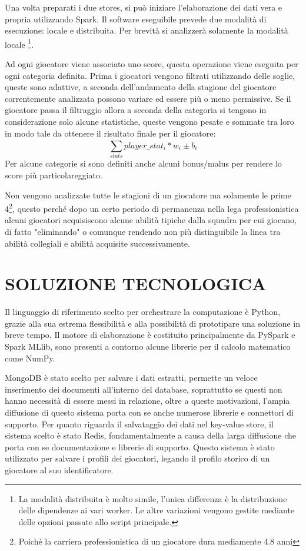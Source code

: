 \documentclass[10pt,a4paper,twocolumn]{article}
\begin{document}
Una volta preparati i due stores, si può iniziare l'elaborazione dei dati vera e propria utilizzando Spark. Il software eseguibile prevede due modalità di esecuzione: locale e distribuita. Per brevità si analizzerà solamente la modalità locale \footnote{La modalità distribuita è molto simile, l'unica differenza è la distribuzione delle dipendenze ai vari worker. Le altre variazioni vengono gestite mediante delle opzioni passate allo script principale.}.

Ad ogni giocatore viene associato uno score, questa operazione viene eseguita per ogni categoria definita. Prima i giocatori vengono filtrati utilizzando delle soglie, queste sono adattive, a seconda dell'andamento della stagione del giocatore correntemente analizzata possono variare ed essere più o meno permissive. Se il giocatore passa il filtraggio allora a seconda della categoria si tengono in considerazione solo alcune statistiche, queste vengono pesate e sommate tra loro in modo tale da ottenere il risultato finale per il giocatore: \[\sum_{stats}^{} player\_stat_{i} * w_{i} \pm b_{i}\] Per alcune categorie si sono definiti anche alcuni bonus/malus per rendere lo score più particolareggiato.

Non vengono analizzate tutte le stagioni di un giocatore ma solamente le prime 4\footnote{Poiché la carriera professionistica di un giocatore dura mediamente 4.8 anni}, questo perché dopo un certo periodo di permanenza nella lega professionistica alcuni giocatori acquisiscono alcune abilità tipiche dalla squadra per cui giocano, di fatto "eliminando" o comunque rendendo non più distinguibile la linea tra abilità collegiali e abilità acquisite successivamente.

\section{SOLUZIONE TECNOLOGICA}

Il linguaggio di riferimento scelto per orchestrare la computazione è Python, grazie alla sua estrema flessibilità e alla possibilità di prototipare una soluzione in breve tempo. Il motore di elaborazione è costituito principalmente da PySpark e Spark MLlib, sono presenti a contorno alcune librerie per il calcolo matematico come NumPy.

MongoDB è stato scelto per salvare i dati estratti, permette un veloce inserimento dei documenti all'interno del database, soprattutto se questi non hanno necessità di essere messi in relazione, oltre a queste motivazioni, l'ampia diffusione di questo sistema porta con se anche numerose librerie e connettori di supporto.
Per quanto riguarda il salvataggio dei dati nel key-value store, il sistema scelto è stato Redis, fondamentalmente a causa della larga diffusione che porta con se documentazione e librerie di supporto. Questo sistema è stato utilizzato per salvare i profili dei giocatori, legando il profilo storico di un giocatore al suo identificatore. 
\end{document}
